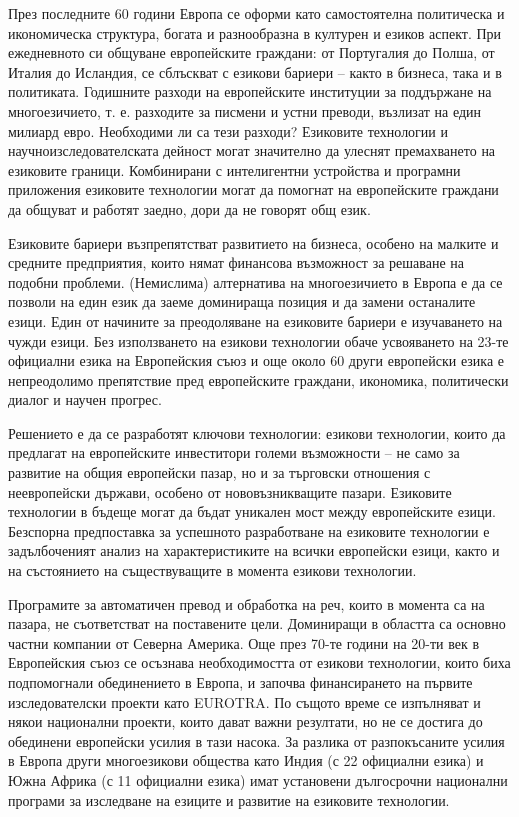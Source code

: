 \documentclass[]{../../metanetpaper}
\begin{document}
\begin{multicols}{2}
През последните 60 години Европа се оформи като самостоятелна политическа и икономическа структура, богата и разнообразна в културен и езиков аспект. При ежедневното си общуване европейските граждани: от Португалия до Полша, от Италия до Исландия, се сблъскват с езикови бариери – както в бизнеса, така и в политиката. Годишните разходи на европейските институции за поддържане на многоезичието, т. е. разходите за писмени и устни преводи, възлизат на един милиард евро. Необходими ли са тези разходи? Езиковите технологии и научноизследователската дейност могат значително да улеснят премахването на езиковите граници. Комбинирани с интелигентни устройства и програмни приложения езиковите технологии могат да помогнат на европейските граждани да общуват и работят заедно, дори да не говорят общ език.


Езиковите бариери възпрепятстват развитието на бизнеса, особено на малките и средните предприятия, които нямат финансова възможност за решаване на подобни проблеми. (Немислима) алтернатива на многоезичието в Европа е да се позволи на един език да заеме доминираща позиция и да замени останалите езици. Един от начините за преодоляване на езиковите бариери е изучаването на чужди езици. Без използването на езикови технологии обаче усвояването на 23-те официални езика на Европейския съюз и още около 60 други европейски езика е непреодолимо препятствие пред европейските граждани, икономика, политически диалог и научен прогрес.

Решението е да се разработят ключови технологии: езикови технологии, които да предлагат на европейските инвеститори големи възможности – не само за развитие на общия европейски пазар, но и за търговски отношения с неевропейски държави, особено от нововъзникващите пазари. Езиковите технологии в бъдеще могат да бъдат уникален мост между европейските езици. Безспорна предпоставка за успешното разработване на езиковите технологии е задълбоченият анализ на характеристиките на всички европейски езици, както и на състоянието на съществуващите в момента езикови технологии.

Програмите за автоматичен превод и обработка на реч, които в момента са на пазара, не съответстват на поставените цели. Доминиращи в областта са основно частни компании от Северна Америка. Още през 70-те години на 20-ти век в Европейския съюз се осъзнава необходимостта от езикови технологии, които биха подпомогнали обединението в Европа, и започва финансирането на първите изследователски проекти като EUROTRA. По същото време се изпълняват и някои национални проекти, които дават важни резултати, но не се достига до обединени европейски усилия в тази насока. За разлика от разпокъсаните усилия в Европа други многоезикови общества като Индия (с 22 официални езика) и Южна Африка (с 11 официални езика) имат установени дългосрочни национални програми за изследване на езиците и развитие на езиковите технологии.


\end{multicols}
\end{document}
